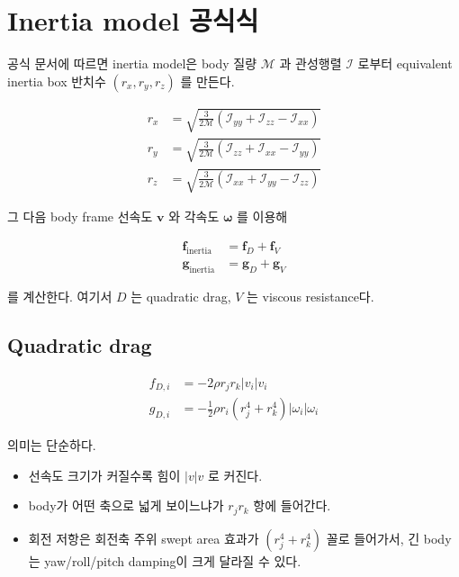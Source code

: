 \documentclass[11pt,a4paper]{article}
\begin{document}
\section{Inertia model 공식식}

공식 문서에 따르면 inertia model은 body 질량 \(\mathcal{M}\) 과 관성행렬 \(\mathcal{I}\) 로부터 equivalent inertia box 반치수 \((r_x, r_y, r_z)\) 를 만든다.

\begin{align*}
r_x &= \sqrt{\frac{3}{2 \mathcal{M}}\left(\mathcal{I}_{yy} + \mathcal{I}_{zz} - \mathcal{I}_{xx}\right)} \\
r_y &= \sqrt{\frac{3}{2 \mathcal{M}}\left(\mathcal{I}_{zz} + \mathcal{I}_{xx} - \mathcal{I}_{yy}\right)} \\
r_z &= \sqrt{\frac{3}{2 \mathcal{M}}\left(\mathcal{I}_{xx} + \mathcal{I}_{yy} - \mathcal{I}_{zz}\right)}
\end{align*}

그 다음 body frame 선속도 \(\mathbf{v}\) 와 각속도 \(\boldsymbol{\omega}\) 를 이용해

\begin{align*}
\mathbf{f}_{\text{inertia}} &= \mathbf{f}_D + \mathbf{f}_V \\
\mathbf{g}_{\text{inertia}} &= \mathbf{g}_D + \mathbf{g}_V
\end{align*}

를 계산한다. 여기서 \(D\) 는 quadratic drag, \(V\) 는 viscous resistance다.

\subsection{Quadratic drag}

\begin{align*}
f_{D,i} &= - 2 \rho r_j r_k |v_i| v_i \\
g_{D,i} &= - \frac{1}{2}\rho r_i \left(r_j^4 + r_k^4\right)|\omega_i|\omega_i
\end{align*}

의미는 단순하다.

\begin{itemize}[leftmargin=2em]
  \item 선속도 크기가 커질수록 힘이 \(|v|v\) 로 커진다.
  \item body가 어떤 축으로 넓게 보이느냐가 \(r_j r_k\) 항에 들어간다.
  \item 회전 저항은 회전축 주위 swept area 효과가 \(\left(r_j^4 + r_k^4\right)\) 꼴로 들어가서, 긴 body는 yaw/roll/pitch damping이 크게 달라질 수 있다.
\end{itemize}
\end{document}
